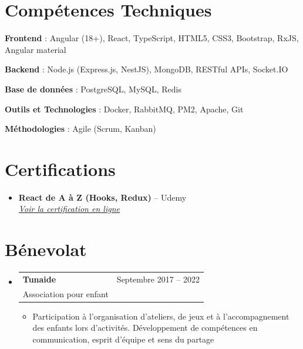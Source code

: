 \documentclass[a4paper,11pt]{article}
\makeatletter
\newcommand{\CVItem}[1]{
  \item\small{#1 \vspace{-2pt}}
}
\newcommand{\CVSubheading}[4]{
  \vspace{-2pt}\item
    \begin{tabular*}{0.97\textwidth}[t]{l@{\extracolsep{\fill}}r}
      \textbf{#1} & #2 \\
      \small#3 & \small #4 \\
    \end{tabular*}\vspace{-7pt}
}
\newcommand{\CVSubHeadingListStart}{\begin{itemize}[leftmargin=0.5cm, label={}]}
\newcommand{\CVSubHeadingListEnd}{\end{itemize}}
\newcommand{\CVItemListStart}{\begin{itemize}}
\newcommand{\CVItemListEnd}{\end{itemize}\vspace{-5pt}}
\makeatother
\begin{document}
\section{Compétences Techniques}
 \begin{itemize}[leftmargin=0.5cm, label={}]
    \small{
     \item \textbf{Frontend} : Angular (18+), React, TypeScript, HTML5, CSS3, Bootstrap, RxJS, Angular material
     \item \textbf{Backend} : Node.js (Express.js, NestJS), MongoDB, RESTful APIs, Socket.IO
     \item \textbf{Base de données} : PostgreSQL, MySQL, Redis
     \item \textbf{Outils et Technologies} : Docker, RabbitMQ, PM2, Apache, Git
     \item \textbf{Méthodologies} : Agile (Scrum, Kanban)
    }
 \end{itemize}

\section{Certifications}
\begin{itemize}[leftmargin=0.5cm]
  \item \textbf{React de A à Z (Hooks, Redux)} – Udemy \\
  \href{https://www.udemy.com/certificate/UC-96bada52-dbe8-46e7-9bc3-90d3e0377070/}{\textit{Voir la certification en ligne}}
\end{itemize}


      
\section{Bénevolat}
  \CVSubHeadingListStart
    \CVSubheading
      {Tunaide}{Septembre 2017 -- 2022}
      {Association pour enfant}{}
      \CVItemListStart
    
        \CVItem{Participation à l’organisation d’ateliers, de jeux et à l’accompagnement des enfants lors d’activités. Développement de compétences en communication, esprit d’équipe et sens du partage}
      \CVItemListEnd
      
  
     
  \CVSubHeadingListEnd
\end{document}
